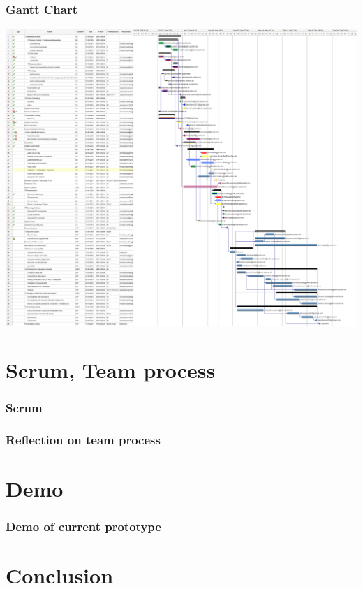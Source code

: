 \begin{frame}
  \frametitle{Gantt Chart}
  \includegraphics[width=1.2\textwidth, height=0.7\textwidth]{images/gantt_chart.png}\\
\end{frame}

\section{Scrum, Team process}

\begin{frame}
  \frametitle{Scrum}
\end{frame}

\begin{frame}
  \frametitle{Reflection on team process}
\end{frame}

\section{Demo}

\begin{frame}
  \frametitle{Demo of current prototype}
\end{frame}

\section{Conclusion}

